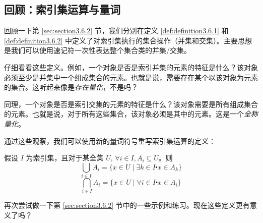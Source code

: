 \subsection{回顾：索引集运算与量词}

回顾一下第 \ref{sec:section3.6.2} 节，我们分别在定义 \ref{def:definition3.6.1} 和 \ref{def:definition3.6.2} 中定义了对索引集执行的集合操作（并集和交集）。主要思想是我们可以使用速记符一次性表达整个集合类的并集/交集。

仔细看看这些定义。例如，一个对象是否是索引并集的元素的特征是什么？该对象必须至少是并集中一个组成集合的元素。也就是说，需要存在某个以该对象为元素的集合。这听起来像是\emph{存在量化}，不是吗？

同理，一个对象是否是索引交集的元素的特征是什么？该对象需要是所有组成集合的元素。也就是说，对于所有这些集合，该对象必须是其中的元素。这是一个\emph{全称量化}。

通过这些观察，我们可以使用新的量词符号重写索引集运算的定义：

\clearpage 

\begin{definition}
    假设 $I$ 为索引集，且对于某全集 $U$, $\forall i \in I, A_i \subseteq U$。则
    \[\bigcup_{i \in I} A_i = \{x \in U \mid \exists k \in I \centerdot x \in A_k\}\]
    \[\bigcap_{i \in I} A_i = \{x \in U \mid \forall i \in I \centerdot x \in A_i\}\]
\end{definition}

再次尝试做一下第 \ref{sec:section3.6.2} 节中的一些示例和练习。现在这些定义更有意义了吗？
